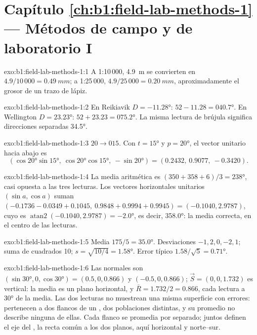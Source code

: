 \section*{Capítulo \ref{ch:b1:field-lab-methods-1} --- Métodos de campo y de laboratorio I}

\begin{solution}{exo:b1:field-lab-methods-1:1}
A 1:10\,000, \qty{4.9}{m} se convierten en $4.9/10\,000 = \qty{0.49}{mm}$; a 1:25\,000,
$4.9/25\,000 = \qty{0.20}{mm}$, aproximadamente el grosor de un trazo de lápiz.
\end{solution}

\begin{solution}{exo:b1:field-lab-methods-1:2}
En Reikiavik $D = \ang{-11.28}$: $52 - 11.28 = \ang{040.7}$. En Wellington
$D = \ang{+23.23}$: $52 + 23.23 = \ang{075.2}$. La misma lectura de brújula significa
direcciones separadas \ang{34.5}.
\end{solution}

\begin{solution}{exo:b1:field-lab-methods-1:3}
$20\to015$. Con $t = \ang{15}$ y $p = \ang{20}$, el vector unitario hacia abajo es
\[
  (\cos\ang{20}\sin\ang{15},\ \cos\ang{20}\cos\ang{15},\ -\sin\ang{20}) =
  (0.2432,\ 0.9077,\ -0.3420).
\]
\end{solution}

\begin{solution}{exo:b1:field-lab-methods-1:4}
La media aritmética es $(350 + 358 + 6)/3 = \ang{238}$, casi opuesta a las tres lecturas. Los vectores
horizontales unitarios $(\sin a, \cos a)$ suman $(-0.1736 - 0.0349 + 0.1045,\ 0.9848 + 0.9994 + 0.9945) = (-0.1040, 2.9787)$, cuyo  es $\operatorname{atan2}(-0.1040, 2.9787) = \ang{-2.0}$, es decir,
\ang{358.0}: la media correcta, en el centro de las lecturas.
\end{solution}

\begin{solution}{exo:b1:field-lab-methods-1:5}
Media $175/5 = \ang{35.0}$. Desviaciones $-1, 2, 0, -2, 1$; suma de cuadrados 10;
$s = \sqrt{10/4} = \ang{1.58}$. Error típico $1.58/\sqrt5 = \ang{0.71}$.
\end{solution}

\begin{solution}{exo:b1:field-lab-methods-1:6}
Las normales son $(\sin\ang{30}, 0, \cos\ang{30}) = (0.5, 0, 0.866)$ y
$(-0.5, 0, 0.866)$; $\vec S = (0, 0, 1.732)$ es vertical: la media es un plano horizontal, y
$\bar R = 1.732/2 = 0.866$, cada lectura a \ang{30} de la media. Las dos lecturas no muestrean una
misma superficie con errores: pertenecen a dos flancos de un , dos poblaciones distintas, y su
promedio no describe ninguna de ellas. Cada flanco se promedia por separado; juntos definen el eje del
, la recta común a los dos planos, aquí horizontal y norte--sur.
\end{solution}

